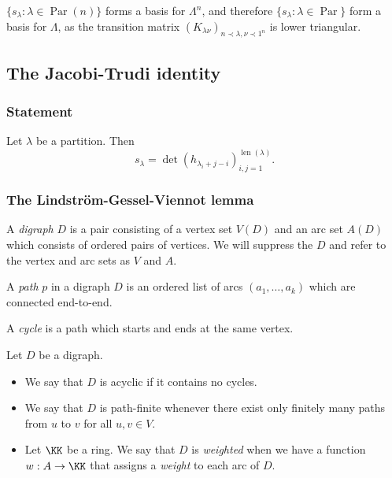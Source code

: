 \documentclass{article}
\DeclareMathOperator{\len}{len}
\DeclareMathOperator{\Par}{Par}
\begin{document}
\begin{corollary}
    $\{ s_\lambda : \lambda \in \Par(n) \}$ forms a basis for $\Lambda^n$, and therefore $\{ s_\lambda : \lambda \in \Par \}$ form a basis for $\Lambda$, as the transition matrix $(K_{\lambda\nu})_{n \prec \lambda, \nu \prec 1^n}$ is lower triangular.
\end{corollary}


\subsection{The Jacobi-Trudi identity}

\subsubsection{Statement}

\begin{theorem} Let $\lambda$ be a partition. Then
    \[
        s_\lambda = \det(h_{\lambda_i+j-i})_{i,j=1}^{\len(\lambda)}.
    \]
\end{theorem}


\subsubsection{The Lindstr\"om-Gessel-Viennot lemma}

\begin{definition} A \textit{digraph} $D$ is a pair consisting of a vertex set $V(D)$ and an arc set $A(D)$ which consists of ordered pairs of vertices. We will suppress the $D$ and refer to the vertex and arc sets as $V$ and $A$.
\end{definition}

\begin{definition}
    A \textit{path} $p$ in a digraph $D$ is an ordered list of arcs $(a_1, \ldots, a_k)$ which are connected end-to-end.
\end{definition}

\begin{definition}
    A \textit{cycle} is a path which starts and ends at the same vertex.
\end{definition}

\begin{definition}
    Let $D$ be a digraph.
    \begin{itemize}
        \item We say that $D$ is acyclic if it contains no cycles.
        \item We say that $D$ is path-finite whenever there exist only finitely many paths from $u$ to $v$ for all $u,v \in V$.
        \item Let $\KK$ be a ring. We say that $D$ is \textit{weighted} when we have a function $w: A \to \KK$ that assigns a \textit{weight} to each arc of $D$.
    \end{itemize}
\end{definition}
\end{document}
